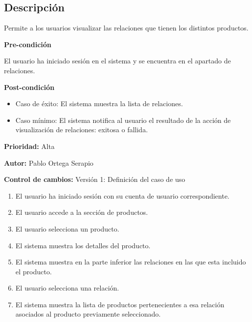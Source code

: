 
\subsection*{Descripción}
Permite a los usuarios visualizar las relaciones que tienen los distintos productos.\par
\vspace{0.15cm}

\textbf{Pre-condición}\par
El usuario ha iniciado sesión en el sistema y se encuentra en el apartado de relaciones.\par
\vspace{0.15cm}

\textbf{Post-condición}
\begin{itemize}
    \item Caso de éxito: El sistema muestra la lista de relaciones.
    \item Caso mínimo: El sistema notifica al usuario el resultado de la acción de visualización de relaciones: exitosa o fallida.
\end{itemize}

\textbf{Prioridad: }
Alta
\vspace{0.15cm}

\textbf{Autor: }
Pablo Ortega Serapio\par
\vspace{0.15cm}

\textbf{Control de cambios: } Versión 1: Definición del caso de uso

\begin{enumerate}
    \item El usuario ha iniciado sesión con su cuenta de usuario correspondiente.
    \item El usuario accede a la sección de productos.
    \item El usuario selecciona un producto.
    \item El sistema muestra los detalles del producto.
    \item El sistema muestra en la parte inferior las relaciones en las que esta incluido el producto.
    \item El usuario selecciona una relación.
    \item El sistema muestra la lista de productos pertenecientes a esa relación asociados al producto previamente seleccionado.
\end{enumerate}

